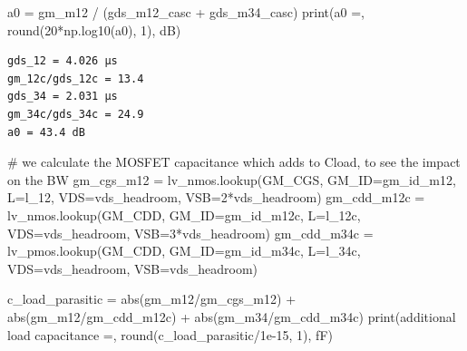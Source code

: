 \documentclass[
  a4paper,
  DIV=11,
  numbers=noendperiod]{scrartcl}
\newenvironment{Shaded}{\begin{snugshade}}{\end{snugshade}}
\newcommand{\BuiltInTok}[1]{\textcolor[rgb]{0.00,0.23,0.31}{#1}}
\newcommand{\CommentTok}[1]{\textcolor[rgb]{0.37,0.37,0.37}{#1}}
\newcommand{\DecValTok}[1]{\textcolor[rgb]{0.68,0.00,0.00}{#1}}
\newcommand{\FloatTok}[1]{\textcolor[rgb]{0.68,0.00,0.00}{#1}}
\newcommand{\NormalTok}[1]{\textcolor[rgb]{0.00,0.23,0.31}{#1}}
\newcommand{\OperatorTok}[1]{\textcolor[rgb]{0.37,0.37,0.37}{#1}}
\newcommand{\StringTok}[1]{\textcolor[rgb]{0.13,0.47,0.30}{#1}}
\begin{document}
\begin{tcolorbox}
\begin{Shaded}
\begin{Highlighting}[]
\NormalTok{a0 }\OperatorTok{=}\NormalTok{ gm\_m12 }\OperatorTok{/}\NormalTok{ (gds\_m12\_casc }\OperatorTok{+}\NormalTok{ gds\_m34\_casc)}
\BuiltInTok{print}\NormalTok{(}\StringTok{\textquotesingle{}a0 =\textquotesingle{}}\NormalTok{, }\BuiltInTok{round}\NormalTok{(}\DecValTok{20}\OperatorTok{*}\NormalTok{np.log10(a0), }\DecValTok{1}\NormalTok{), }\StringTok{\textquotesingle{}dB\textquotesingle{}}\NormalTok{)}
\end{Highlighting}
\end{Shaded}

\begin{verbatim}
gds_12 = 4.026 µs
gm_12c/gds_12c = 13.4
gds_34 = 2.031 µs
gm_34c/gds_34c = 24.9
a0 = 43.4 dB
\end{verbatim}

\begin{Shaded}
\begin{Highlighting}[]
\CommentTok{\# we calculate the MOSFET capacitance which adds to Cload, to see the impact on the BW}
\NormalTok{gm\_cgs\_m12 }\OperatorTok{=}\NormalTok{ lv\_nmos.lookup(}\StringTok{\textquotesingle{}GM\_CGS\textquotesingle{}}\NormalTok{, GM\_ID}\OperatorTok{=}\NormalTok{gm\_id\_m12, L}\OperatorTok{=}\NormalTok{l\_12, VDS}\OperatorTok{=}\NormalTok{vds\_headroom, VSB}\OperatorTok{=}\DecValTok{2}\OperatorTok{*}\NormalTok{vds\_headroom)}
\NormalTok{gm\_cdd\_m12c }\OperatorTok{=}\NormalTok{ lv\_nmos.lookup(}\StringTok{\textquotesingle{}GM\_CDD\textquotesingle{}}\NormalTok{, GM\_ID}\OperatorTok{=}\NormalTok{gm\_id\_m12c, L}\OperatorTok{=}\NormalTok{l\_12c, VDS}\OperatorTok{=}\NormalTok{vds\_headroom, VSB}\OperatorTok{=}\DecValTok{3}\OperatorTok{*}\NormalTok{vds\_headroom)}
\NormalTok{gm\_cdd\_m34c }\OperatorTok{=}\NormalTok{ lv\_pmos.lookup(}\StringTok{\textquotesingle{}GM\_CDD\textquotesingle{}}\NormalTok{, GM\_ID}\OperatorTok{=}\NormalTok{gm\_id\_m34c, L}\OperatorTok{=}\NormalTok{l\_34c, VDS}\OperatorTok{=}\NormalTok{vds\_headroom, VSB}\OperatorTok{=}\NormalTok{vds\_headroom)}

\NormalTok{c\_load\_parasitic }\OperatorTok{=} \BuiltInTok{abs}\NormalTok{(gm\_m12}\OperatorTok{/}\NormalTok{gm\_cgs\_m12) }\OperatorTok{+} \BuiltInTok{abs}\NormalTok{(gm\_m12}\OperatorTok{/}\NormalTok{gm\_cdd\_m12c) }\OperatorTok{+} \BuiltInTok{abs}\NormalTok{(gm\_m34}\OperatorTok{/}\NormalTok{gm\_cdd\_m34c)}
\BuiltInTok{print}\NormalTok{(}\StringTok{\textquotesingle{}additional load capacitance =\textquotesingle{}}\NormalTok{, }\BuiltInTok{round}\NormalTok{(c\_load\_parasitic}\OperatorTok{/}\FloatTok{1e{-}15}\NormalTok{, }\DecValTok{1}\NormalTok{), }\StringTok{\textquotesingle{}fF\textquotesingle{}}\NormalTok{)}


\end{Highlighting}
\end{Shaded}
\end{tcolorbox}
\end{document}
